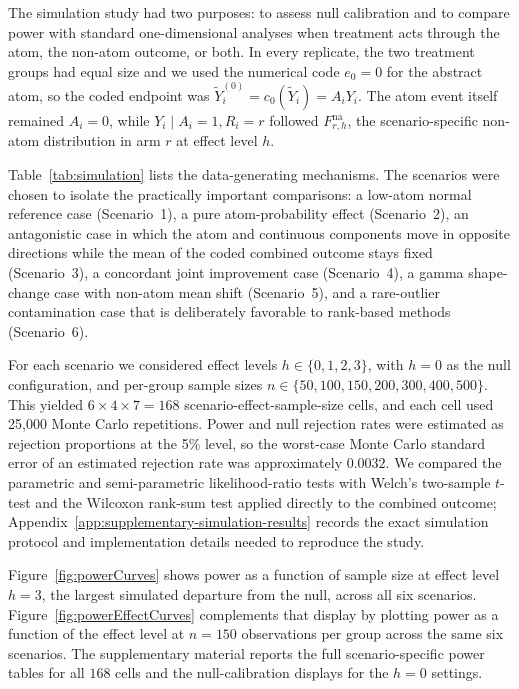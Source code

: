 \documentclass[11pt]{article}
\begin{document}
The simulation study had two purposes: to assess null calibration and to compare power with standard one-dimensional analyses when treatment acts through the atom, the non-atom outcome, or both. In every replicate, the two treatment groups had equal size and we used the numerical code $e_0=0$ for the abstract atom, so the coded endpoint was $\widetilde{Y}_i^{(0)}=c_0(\widetilde{Y}_i)=A_iY_i$. The atom event itself remained $A_i=0$, while $Y_i\mid A_i=1,R_i=r$ followed $F_{r,h}^{\mathrm{na}}$, the scenario-specific non-atom distribution in arm $r$ at effect level $h$.

Table~\ref{tab:simulation} lists the data-generating mechanisms. The scenarios were chosen to isolate the practically important comparisons: a low-atom normal reference case (Scenario~1), a pure atom-probability effect (Scenario~2), an antagonistic case in which the atom and continuous components move in opposite directions while the mean of the coded combined outcome stays fixed (Scenario~3), a concordant joint improvement case (Scenario~4), a gamma shape-change case with non-atom mean shift (Scenario~5), and a rare-outlier contamination case that is deliberately favorable to rank-based methods (Scenario~6).



For each scenario we considered effect levels $h \in \{0, 1, 2, 3\}$, with $h = 0$ as the null configuration, and per-group sample sizes $n \in \{50,100,150,200,300,400,500\}$. This yielded $6 \times 4 \times 7 = 168$ scenario-effect-sample-size cells, and each cell used 25,000 Monte Carlo repetitions. Power and null rejection rates were estimated as rejection proportions at the 5\% level, so the worst-case Monte Carlo standard error of an estimated rejection rate was approximately $0.0032$. We compared the parametric and semi-parametric likelihood-ratio tests with Welch's two-sample $t$-test and the Wilcoxon rank-sum test applied directly to the combined outcome; Appendix~\ref{app:supplementary-simulation-results} records the exact simulation protocol and implementation details needed to reproduce the study.

Figure~\ref{fig:powerCurves} shows power as a function of sample size at effect level $h=3$, the largest simulated departure from the null, across all six scenarios. Figure~\ref{fig:powerEffectCurves} complements that display by plotting power as a function of the effect level at $n = 150$ observations per group across the same six scenarios. The supplementary material reports the full scenario-specific power tables for all $168$ cells and the null-calibration displays for the $h = 0$ settings.
\end{document}
